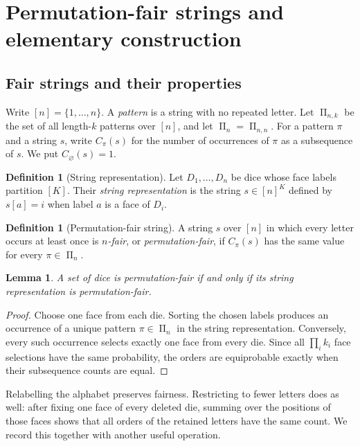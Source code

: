 \documentclass[11pt]{article}
\newtheorem{lemma}[theorem]{Lemma}
\theoremstyle{definition}
\newtheorem{definition}[theorem]{Definition}
\theoremstyle{remark}
\newcommand{\PiSet}{\mathop{\Pi}}
\begin{document}
\section{Permutation-fair strings and elementary construction}\label{sec:prelim}

\subsection{Fair strings and their properties}

Write \([n]=\{1,\ldots,n\}\).  A \emph{pattern} is a string with no repeated
letter.  Let \(\PiSet_{n,k}\) be the set of all length-\(k\) patterns over
\([n]\), and let \(\PiSet_n=\PiSet_{n,n}\).  For a pattern \(\pi\) and a string
\(s\), write \(C_\pi(s)\) for the number of occurrences of \(\pi\) as a
subsequence of \(s\).  We put \(C_\varnothing(s)=1\).

\begin{definition}[String representation]
Let \(D_1,\ldots,D_n\) be dice whose face labels partition \([K]\).  Their
\emph{string representation} is the string \(s\in[n]^K\) defined by
\(s[a]=i\) when label \(a\) is a face of \(D_i\).
\end{definition}

\begin{definition}[Permutation-fair string]
A string \(s\) over \([n]\) in which every letter occurs at least once is
\emph{\(n\)-fair}, or \emph{permutation-fair}, if \(C_\pi(s)\) has the same
value for every \(\pi\in\PiSet_n\).
\end{definition}

\begin{lemma}\label{lem:dice-string}
A set of dice is permutation-fair if and only if its string representation is
permutation-fair.
\end{lemma}

\begin{proof}
Choose one face from each die.  Sorting the chosen labels produces an
occurrence of a unique pattern \(\pi\in\PiSet_n\) in the string
representation.  Conversely, every such occurrence selects exactly one face
from every die.  Since all \(\prod_i k_i\) face selections have the same
probability, the orders are equiprobable exactly when their subsequence counts
are equal.
\end{proof}

Relabelling the alphabet preserves fairness.  Restricting to fewer letters
does as well: after fixing one face of every deleted die, summing over the
positions of those faces shows that all orders of the retained letters have
the same count.  We record this together with another useful operation.
\end{document}
